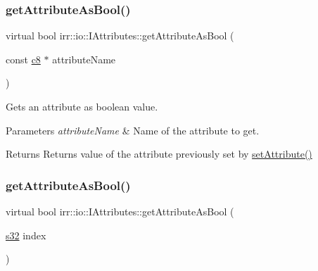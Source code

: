\subsubsection{\texorpdfstring{get\+Attribute\+As\+Bool()}{getAttributeAsBool()}\hspace{0.1cm}{\footnotesize\ttfamily [1/2]}}
{\footnotesize\ttfamily virtual bool irr\+::io\+::\+I\+Attributes\+::get\+Attribute\+As\+Bool (\begin{DoxyParamCaption}\item[{const \hyperlink{namespaceirr_a9395eaea339bcb546b319e9c96bf7410}{c8} $\ast$}]{attribute\+Name }\end{DoxyParamCaption})\hspace{0.3cm}{\ttfamily [pure virtual]}}



Gets an attribute as boolean value. 


\begin{DoxyParams}{Parameters}
{\em attribute\+Name} & Name of the attribute to get. \\
\hline
\end{DoxyParams}
\begin{DoxyReturn}{Returns}
Returns value of the attribute previously set by \hyperlink{classirr_1_1io_1_1IAttributes_a03fa31acb481ae23678676cc183f09a6}{set\+Attribute()} 
\end{DoxyReturn}
\mbox{\label{classirr_1_1io_1_1IAttributes_acf9dc477c8610923c373d2ad15ff7752}} 
\subsubsection{\texorpdfstring{get\+Attribute\+As\+Bool()}{getAttributeAsBool()}\hspace{0.1cm}{\footnotesize\ttfamily [2/2]}}
{\footnotesize\ttfamily virtual bool irr\+::io\+::\+I\+Attributes\+::get\+Attribute\+As\+Bool (\begin{DoxyParamCaption}\item[{\hyperlink{namespaceirr_ac66849b7a6ed16e30ebede579f9b47c6}{s32}}]{index }\end{DoxyParamCaption})\hspace{0.3cm}{\ttfamily [pure virtual]}}



